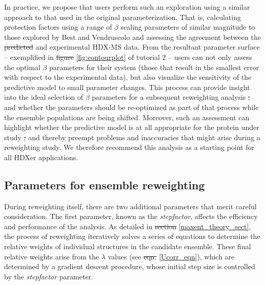 \documentclass[9pt,tutorial]{livecoms}
\providecommand{\DIFadd}[1]{{\protect\color{blue}\uwave{#1}}} %
\providecommand{\DIFdel}[1]{{\protect\color{red}\sout{#1}}}                      %
\providecommand{\DIFaddbegin}{} %
\providecommand{\DIFaddend}{} %
\providecommand{\DIFdelbegin}{} %
\providecommand{\DIFdelend}{} %
\begin{document}
In practice, we propose that users perform such an exploration using a similar approach to that used in the original parameterization.
That is, calculating protection factors using a range of $\beta$ scaling parameters of similar magnitude to those explored by Best and Vendruscolo and assessing the agreement between the \DIFdelbegin \DIFdel{predicted }\DIFdelend \DIFaddbegin \DIFadd{calculated }\DIFaddend and experimental HDX-MS data.
From the resultant parameter surface -- exemplified in \DIFdelbegin \DIFdel{figure }\DIFdelend \DIFaddbegin \DIFadd{Figure }\DIFaddend \ref{fig:contourplot} of tutorial 2 -- users can not only assess the optimal $\beta$ parameters for their system (those that result in the smallest error with respect to the experimental data), but also visualize the sensitivity of the predictive model to small parameter changes.
This process can provide insight into the ideal selection of $\beta$ parameters for a subsequent reweighting analysis \DIFdelbegin \DIFdel{, }\DIFdelend and whether the parameters should be re-optimized as part of that process while the ensemble populations are being shifted.
Moreover, such an assessment can highlight whether the predictive model is at all appropriate for the protein under study \DIFdelbegin \DIFdel{, }\DIFdelend and thereby preempt problems and inaccuracies that might arise during a reweighting study.
We therefore recommend this analysis as a starting point for all HDXer applications.

\subsection{Parameters for ensemble reweighting}
During reweighting itself, there are two additional parameters that merit careful consideration.
The first parameter, known as the \textit{stepfactor}, affects the efficiency and performance of the analysis. 
As detailed in \DIFdelbegin \DIFdel{section }\DIFdelend \DIFaddbegin \DIFadd{Section }\DIFaddend \ref{maxent_theory_sect}, the process of reweighting iteratively solves a series of equations to determine the relative weights of individual structures in the candidate ensemble.
These final relative weights arise from the $\lambda$ values (see \DIFdelbegin \DIFdel{eqn. }\DIFdelend \DIFaddbegin \DIFadd{Equation }\DIFaddend \ref{Ucorr_eqn}), which are determined by a gradient descent procedure, whose initial step size is controlled by the \textit{stepfactor} parameter.
\end{document}
